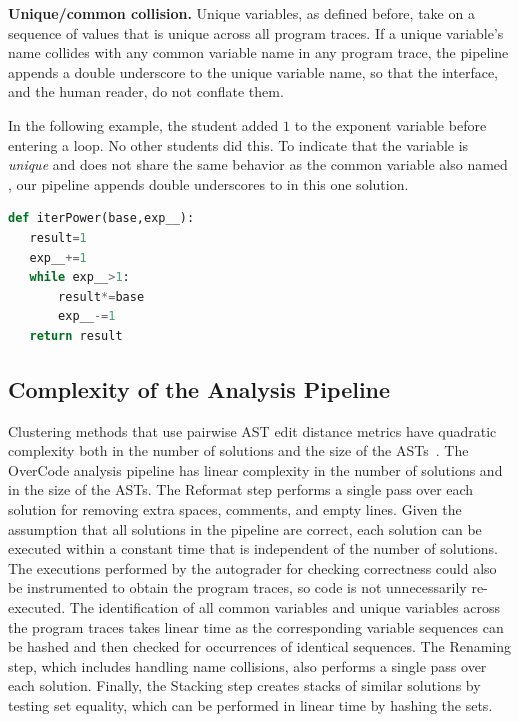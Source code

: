 {\bf Unique/common collision.} Unique variables, as defined before, take on a sequence of values that is unique across all program traces. If a unique variable's name collides with any common variable name in any program trace, the pipeline appends a double underscore to the unique variable name, so that the interface, and the human reader, do not conflate them. 

In the following example, the student added $1$ to the exponent variable before entering a  loop. No other students did this. To indicate that the  variable is {\it unique} and does not share the same behavior as the common variable also named , our pipeline appends double underscores to  in this one solution. 

\begin{minipage}{0.45\linewidth}
\begin{lstlisting}[language=python,linebackgroundcolor={\lstcolorlines[lightyellow]{1,3,4,6}}]
def iterPower(base,exp__):
   result=1
   exp__+=1
   while exp__>1:
       result*=base
       exp__-=1
   return result
\end{lstlisting}
\end{minipage}



\subsection{Complexity of the Analysis Pipeline}\label{complexity}
Clustering methods that use pairwise AST edit distance metrics have quadratic complexity both in the number of solutions and the size of the ASTs~\cite{MOOCshop}. The OverCode analysis pipeline has linear complexity in the number of solutions and in the size of the ASTs. The Reformat step performs a single pass over each solution for removing extra spaces, comments, and empty lines. Given the assumption that all solutions in the pipeline are correct, each solution can be executed within a constant time that is independent of the number of solutions. The executions performed by the autograder for checking correctness could also be instrumented to obtain the program traces, so code is not unnecessarily re-executed. The identification of all common variables and unique variables across the program traces takes linear time as the corresponding variable sequences can be hashed and then checked for occurrences of identical sequences. The Renaming step, which includes handling name collisions, also performs a single pass over each solution. Finally, the Stacking step creates stacks of similar solutions by testing set equality, which can be performed in linear time by hashing the sets.


